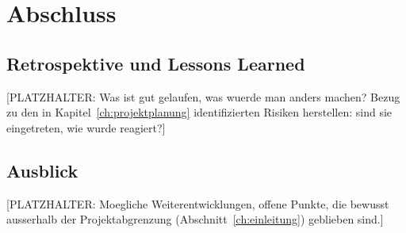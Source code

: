 \chapter{Abschluss}
\label{ch:abschluss}

\section{Retrospektive und Lessons Learned}
[PLATZHALTER: Was ist gut gelaufen, was wuerde man anders machen? Bezug zu
den in Kapitel~\ref{ch:projektplanung} identifizierten Risiken herstellen:
sind sie eingetreten, wie wurde reagiert?]

\section{Ausblick}
[PLATZHALTER: Moegliche Weiterentwicklungen, offene Punkte, die bewusst
ausserhalb der Projektabgrenzung (Abschnitt~\ref{ch:einleitung}) geblieben
sind.]
